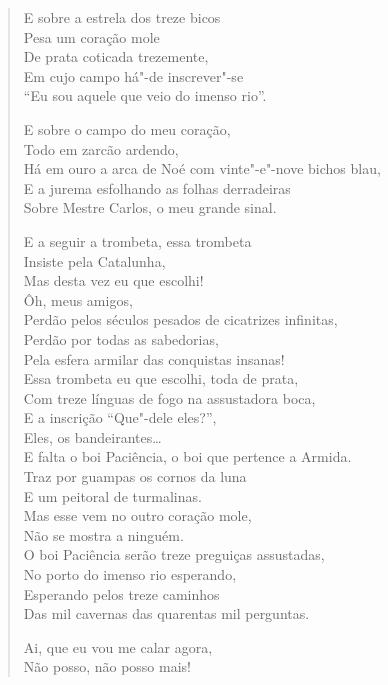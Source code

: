 {\begin{verse}
E sobre a estrela dos treze bicos\\
Pesa um coração mole\\
De prata coticada trezemente,\\
Em cujo campo há"-de inscrever"-se\\
``Eu sou aquele que veio do imenso rio''.

E sobre o campo do meu coração,\\
Todo em zarcão ardendo,\\
Há em ouro a arca de Noé com vinte"-e"-nove bichos blau,\\
E a jurema esfolhando as folhas derradeiras\\
Sobre Mestre Carlos, o meu grande sinal.

E a seguir a trombeta, essa trombeta\\
Insiste pela Catalunha,\\
Mas desta vez eu que escolhi!\\
Ôh, meus amigos,\\
Perdão pelos séculos pesados de cicatrizes infinitas,\\
Perdão por todas as sabedorias,\\
Pela esfera armilar das conquistas insanas!\\
Essa trombeta eu que escolhi, toda de prata,\\
Com treze línguas de fogo na assustadora boca,\\
E a inscrição ``Que"-dele eles?'',\\
Eles, os bandeirantes\ldots{}\\
E falta o boi Paciência, o boi que pertence a Armida.\\
Traz por guampas os cornos da luna\\
E um peitoral de turmalinas.\\
Mas esse vem no outro coração mole,\\
Não se mostra a ninguém.\\
O boi Paciência serão treze preguiças assustadas,\\
No porto do imenso rio esperando,\\
Esperando pelos treze caminhos\\
Das mil cavernas das quarentas mil perguntas.

Ai, que eu vou me calar agora,\\
Não posso, não posso mais!
\end{verse}



}
